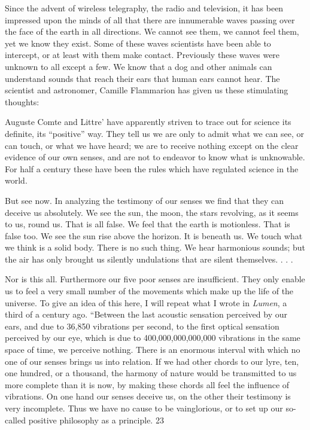 Since the advent of wireless telegraphy, the radio and television, it has been impressed upon
the minds of all that there are innumerable waves passing over the face of the earth in all
directions. We cannot see them, we cannot feel them, yet we know they exist. Some of these
waves scientists have been able to intercept, or at least with them make contact. Previously
these waves were unknown to all except a few. We know that a dog and other animals can
understand sounds that reach their ears that human ears cannot hear. The scientist and
astronomer, Camille Flammarion has given us these stimulating thoughts:

Auguste Comte and Littre' have apparently striven to trace out for science its definite, its
``positive'' way. They tell us we are only to admit what we can see, or can touch, or what we
have heard; we are to receive nothing except on the clear evidence of our own senses, and are
not to endeavor to know what is unknowable. For half a century these have been the rules
which have regulated science in the world.

But see now. In analyzing the testimony of our senses we find that they can deceive us
absolutely. We see the sun, the moon, the stars revolving, as it seems to us, round us. That is
all false. We feel that the earth is motionless. That is false too. We see the sun rise above the
horizon. It is beneath us. We touch what we think is a solid body. There is no such thing. We
hear harmonious sounds; but the air has only brought us silently undulations that are silent
themselves. . . .

Nor is this all. Furthermore our five poor senses are insufficient. They only enable us to feel
a very small number of the movements which make up the life of the universe. To give an
idea of this here, I will repeat what I wrote in \textit{Lumen}, a third of a century ago. ``Between the
last acoustic sensation perceived by our ears, and due to 36,850 vibrations per second, to the
first optical sensation perceived by our eye, which is due to 400,000,000,000,000 vibrations
in the same space of time, we perceive nothing. There is an enormous interval with which no
one of our senses brings us into relation. If we had other chords to our lyre, ten, one hundred,
or a thousand, the harmony of nature would be transmitted to us more complete than it is
now, by making these chords all feel the influence of vibrations. On one hand our senses
deceive us, on the other their testimony is very incomplete. Thus we have no cause to be
vainglorious, or to set up our so-called positive philosophy as a principle. 23

